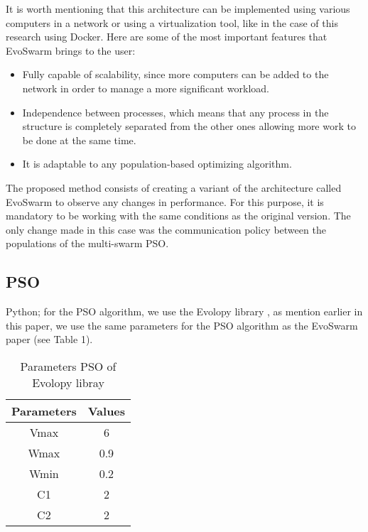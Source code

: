 \documentclass[runningheads]{llncs}
\begin{document}
It is worth mentioning that this architecture can be implemented using various
computers in a network or using a virtualization tool, like in the case of this
research using Docker. Here are some of the most important features that
EvoSwarm brings to the user:

\begin{itemize} 
  
  \item Fully capable of scalability, since more computers can be added to the
  network in order to manage a more significant workload.
    
    \item Independence between processes, which means that any process in the
    structure is completely separated from the other ones allowing more work to
    be done at the same time.
    
    \item It is adaptable to any population-based optimizing algorithm.
\end{itemize}



The proposed method consists of creating a variant of the architecture called
EvoSwarm to observe any changes in performance. For this purpose, it is
mandatory to be working with the same conditions as the original version. The
only change made in this case was the communication policy between the
populations of the multi-swarm PSO.

\subsection{PSO} 


Python; for the PSO algorithm, we use the Evolopy library \cite{b19}, as mention
earlier in this paper, we use the same parameters for the PSO algorithm as the
EvoSwarm paper (see Table 1).

\begin{table}[h!]
\centering
\caption{Parameters PSO of Evolopy libray}
\begin{tabular}{|c c|} 
 \hline
 Parameters & Values  \\ [0.5ex] 
 \hline\hline
 Vmax & 6 \\ 
 Wmax & 0.9 \\
 Wmin & 0.2 \\
C1 & 2 \\
C2 & 2 \\[0.5ex]
 \hline
\end{tabular}
\label{table:1}
\end{table}
\end{document}
